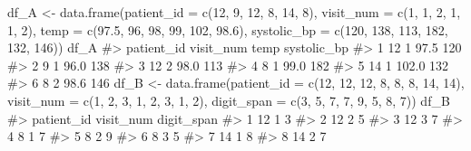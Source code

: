 \documentclass[
  letterpaper,
]{krantz}
\makeatletter
\newenvironment{Shaded}{\begin{snugshade}}{\end{snugshade}}
\newcommand{\AttributeTok}[1]{\textcolor[rgb]{0.40,0.45,0.13}{#1}}
\newcommand{\CommentTok}[1]{\textcolor[rgb]{0.37,0.37,0.37}{#1}}
\newcommand{\DecValTok}[1]{\textcolor[rgb]{0.68,0.00,0.00}{#1}}
\newcommand{\FloatTok}[1]{\textcolor[rgb]{0.68,0.00,0.00}{#1}}
\newcommand{\FunctionTok}[1]{\textcolor[rgb]{0.28,0.35,0.67}{#1}}
\newcommand{\NormalTok}[1]{\textcolor[rgb]{0.00,0.23,0.31}{#1}}
\newcommand{\OtherTok}[1]{\textcolor[rgb]{0.00,0.23,0.31}{#1}}
\newenvironment{kframe}{%
\medskip{}
\setlength{\fboxsep}{.8em}
 \def\at@end@of@kframe{}%
 \ifinner\ifhmode%
  \def\at@end@of@kframe{\end{minipage}}%
  \begin{minipage}{\columnwidth}%
 \fi\fi%
 \def\FrameCommand##1{\hskip\@totalleftmargin \hskip-\fboxsep
 \colorbox{shadecolor}{##1}\hskip-\fboxsep
     \hskip-\linewidth \hskip-\@totalleftmargin \hskip\columnwidth}%
 \MakeFramed {\advance\hsize-\width
   \@totalleftmargin\z@ \linewidth\hsize
   \@setminipage}}%
 {\par\unskip\endMakeFramed%
 \at@end@of@kframe}
\renewenvironment{Shaded}{\begin{kframe}}{\end{kframe}}
\makeatother
\begin{document}
\begin{Shaded}
\begin{Highlighting}[]
\NormalTok{df\_A }\OtherTok{\textless{}{-}} \FunctionTok{data.frame}\NormalTok{(}\AttributeTok{patient\_id =} \FunctionTok{c}\NormalTok{(}\DecValTok{12}\NormalTok{, }\DecValTok{9}\NormalTok{, }\DecValTok{12}\NormalTok{, }\DecValTok{8}\NormalTok{, }\DecValTok{14}\NormalTok{, }\DecValTok{8}\NormalTok{), }
                  \AttributeTok{visit\_num =} \FunctionTok{c}\NormalTok{(}\DecValTok{1}\NormalTok{, }\DecValTok{1}\NormalTok{, }\DecValTok{2}\NormalTok{, }\DecValTok{1}\NormalTok{, }\DecValTok{1}\NormalTok{, }\DecValTok{2}\NormalTok{), }
                  \AttributeTok{temp =} \FunctionTok{c}\NormalTok{(}\FloatTok{97.5}\NormalTok{, }\DecValTok{96}\NormalTok{, }\DecValTok{98}\NormalTok{, }\DecValTok{99}\NormalTok{, }\DecValTok{102}\NormalTok{, }\FloatTok{98.6}\NormalTok{), }
                  \AttributeTok{systolic\_bp =} \FunctionTok{c}\NormalTok{(}\DecValTok{120}\NormalTok{, }\DecValTok{138}\NormalTok{, }\DecValTok{113}\NormalTok{, }\DecValTok{182}\NormalTok{, }\DecValTok{132}\NormalTok{, }\DecValTok{146}\NormalTok{))}
\NormalTok{df\_A}
\CommentTok{\#\textgreater{}   patient\_id visit\_num  temp systolic\_bp}
\CommentTok{\#\textgreater{} 1         12         1  97.5         120}
\CommentTok{\#\textgreater{} 2          9         1  96.0         138}
\CommentTok{\#\textgreater{} 3         12         2  98.0         113}
\CommentTok{\#\textgreater{} 4          8         1  99.0         182}
\CommentTok{\#\textgreater{} 5         14         1 102.0         132}
\CommentTok{\#\textgreater{} 6          8         2  98.6         146}
\NormalTok{df\_B }\OtherTok{\textless{}{-}} \FunctionTok{data.frame}\NormalTok{(}\AttributeTok{patient\_id =} \FunctionTok{c}\NormalTok{(}\DecValTok{12}\NormalTok{, }\DecValTok{12}\NormalTok{, }\DecValTok{12}\NormalTok{, }\DecValTok{8}\NormalTok{, }\DecValTok{8}\NormalTok{, }\DecValTok{8}\NormalTok{, }\DecValTok{14}\NormalTok{, }\DecValTok{14}\NormalTok{), }
                   \AttributeTok{visit\_num =} \FunctionTok{c}\NormalTok{(}\DecValTok{1}\NormalTok{, }\DecValTok{2}\NormalTok{, }\DecValTok{3}\NormalTok{, }\DecValTok{1}\NormalTok{, }\DecValTok{2}\NormalTok{, }\DecValTok{3}\NormalTok{, }\DecValTok{1}\NormalTok{, }\DecValTok{2}\NormalTok{),}
                   \AttributeTok{digit\_span =} \FunctionTok{c}\NormalTok{(}\DecValTok{3}\NormalTok{, }\DecValTok{5}\NormalTok{, }\DecValTok{7}\NormalTok{, }\DecValTok{7}\NormalTok{, }\DecValTok{9}\NormalTok{, }\DecValTok{5}\NormalTok{, }\DecValTok{8}\NormalTok{, }\DecValTok{7}\NormalTok{))}
\NormalTok{df\_B}
\CommentTok{\#\textgreater{}   patient\_id visit\_num digit\_span}
\CommentTok{\#\textgreater{} 1         12         1          3}
\CommentTok{\#\textgreater{} 2         12         2          5}
\CommentTok{\#\textgreater{} 3         12         3          7}
\CommentTok{\#\textgreater{} 4          8         1          7}
\CommentTok{\#\textgreater{} 5          8         2          9}
\CommentTok{\#\textgreater{} 6          8         3          5}
\CommentTok{\#\textgreater{} 7         14         1          8}
\CommentTok{\#\textgreater{} 8         14         2          7}
\end{Highlighting}
\end{Shaded}
\end{document}
